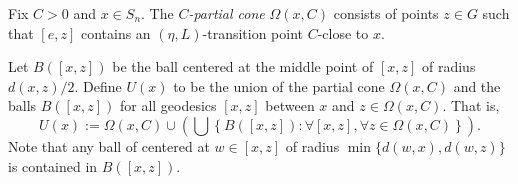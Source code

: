 \documentclass{amsart}
\newcommand{\showcomments}{yes}
\newenvironment{comment}%
{\ifthenelse{\equal{\showcomments}{yes}}%
{\footnotemark
    \begin{lrbox}{\commentbox}
    \begin{minipage}[t]{1.25in}\raggedright\sffamily\upshape\tiny
    \footnotemark[\arabic{footnote}]}%
{\begin{lrbox}{\commentbox}}}%
{\ifthenelse{\equal{\showcomments}{yes}}%
{\end{minipage}\end{lrbox}\marginpar{\usebox{\commentbox}}}%
{\end{lrbox}}}
\newtheorem{lem}[thm]{Lemma}
\theoremstyle{definition}
\theoremstyle{remark}
\begin{document}
 



Fix  $C>0$ and $x\in S_n$. The \textit{$C$-{\color{blue}}partial cone} $\Omega(x,C)$ consists  of points $z\in G$ such that $[e,z]$ contains an $(\eta, L)$-transition point $C$-close to $x$. %


Let $B([x,z])$ be the ball centered at the middle point of $[x,z]$  of radius ${d(x,z)/2}$. Define $U(x)$ to be the union of the partial cone $\Omega(x, C)$ and the balls $B([x,z])$ for all geodesics $[x,z]$ between $x$ and $z\in \Omega(x,C)$. That is,
$$
U(x):= \Omega(x,C) \cup \left( \bigcup\left\{B([x,z]): \forall [x,z], \forall z\in  \Omega(x,C)\right\} \right). 
$$
Note that any ball of centered at $w\in[x,z]$ of radius $\min\{d(w,x), d(w,z)\}$ is contained in $B([x,z])$.
\end{document}
